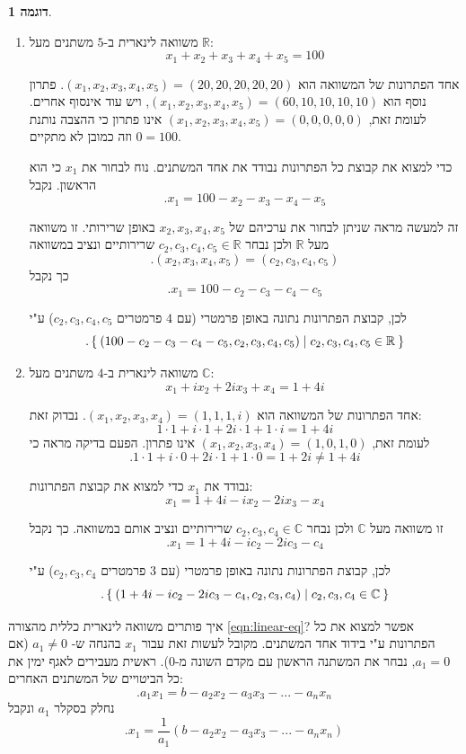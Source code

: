 \documentclass[12pt]{report}
\theoremstyle{plain}
\theoremstyle{definition}
\newtheorem{example}{דוגמה}[chapter]
\newcommand{\R}{\mathbb{R}}
\newcommand{\C}{\mathbb{C}}
\newcommand{\0}{\mathbf{0}}
\begin{document}
\begin{example}\
\begin{enumerate}[label=\alph*.]
\item 
משוואה לינארית ב-$5$ משתנים מעל $\R$:
$$
x_1+x_2+x_3+x_4+x_5=100
$$

אחד הפתרונות של המשוואה הוא
$(x_1,x_2,x_3,x_4,x_5)=(20,20,20,20,20)$.
פתרון נוסף הוא
$(x_1,x_2,x_3,x_4,x_5)=(60,10,10,10,10)$,
ויש עוד אינסוף אחרים. לעומת זאת,
$(x_1,x_2,x_3,x_4,x_5)=(0,0,0,0,0)$
אינו פתרון כי ההצבה נותנת
$0=100$ 
וזה כמובן לא מתקיים.

כדי למצוא את קבוצת כל הפתרונות נבודד את אחד המשתנים. נוח לבחור את
$x_1$
כי הוא הראשון. נקבל
$$
.x_1=100-x_2-x_3-x_4-x_5
$$

זה למעשה מראה שניתן לבחור את ערכיהם של
$x_2,x_3,x_4,x_5$
באופן שרירותי. זו משוואה מעל
$\R$ 
ולכן נבחר
$c_2,c_3,c_4,c_5\in\R$
שרירותיים ונציב במשוואה
$$.(x_2,x_3,x_4,x_5)=(c_2,c_3,c_4,c_5)$$
כך נקבל
$$
.x_1=100-c_2-c_3-c_4-c_5
$$

לכן, קבוצת הפתרונות נתונה באופן פרמטרי (עם 
$4$
פרמטרים
$c_2,c_3,c_4,c_5$) ע"י
$$
.\Set{(100-c_2-c_3-c_4-c_5,c_2,c_3,c_4,c_5)|c_2,c_3,c_4,c_5\in\R}
$$

\item
משוואה לינארית ב-$4$ משתנים מעל $\C$:
$$
x_1+ix_2+2ix_3+x_4=1+4i
$$

אחד הפתרונות של המשוואה הוא
$(x_1,x_2,x_3,x_4)=(1,1,1,i)$.
נבדוק זאת:
$$1\cdot 1+i\cdot 1+2i\cdot 1+1\cdot i=1+4i$$
לעומת זאת,
$(x_1,x_2,x_3,x_4)=(1,0,1,0)$
אינו פתרון. הפעם בדיקה מראה כי
$$.1\cdot 1+i\cdot 0+2i\cdot 1+1\cdot 0=1+2i\neq1+4i$$

נבודד את
$x_1$
כדי למצוא את קבוצת הפתרונות:
$$
x_1=1+4i-ix_2-2ix_3-x_4
$$

זו משוואה מעל
$\C$
ולכן נבחר
$c_2,c_3,c_4\in\C$
שרירותיים ונציב אותם במשוואה. כך נקבל
$$
.x_1=1+4i-ic_2-2ic_3-c_4
$$

לכן, קבוצת הפתרונות נתונה באופן פרמטרי (עם 
$3$
פרמטרים
$c_2,c_3,c_4$)
ע"י
$$
.\Set{(1+4i-ic_2-2ic_3-c_4,c_2,c_3,c_4)|c_2,c_3,c_4\in\C}
$$
\end{enumerate}
\end{example}

איך פותרים משוואה לינארית כללית מהצורה 
\ref{eqn:linear-eq}?
 אפשר למצוא את כל הפתרונות ע"י בידוד אחד המשתנים. מקובל לעשות זאת עבור
$x_1$
בהנחה ש-
$a_1\neq0$
(אם
$a_1=0$,
נבחר את המשתנה הראשון עם מקדם השונה מ-$0$). ראשית מעבירים לאגף ימין את כל הביטויים של המשתנים האחרים:
$$
.a_1x_1=b-a_2x_2-a_3x_3-...-a_nx_n
$$
נחלק בסקלר 
$a_1$
ונקבל
$$
.x_1=\frac{1}{a_1}(b-a_2x_2-a_3x_3-...-a_nx_n)
$$
\end{document}
